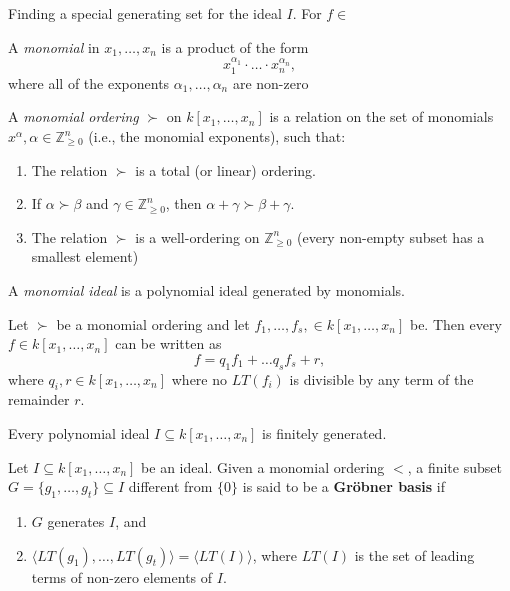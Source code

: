 \documentclass[../main.tex]{subfiles}
\begin{document}
    Finding a special generating set for the ideal $I$. For $f\in $

    \begin{definition}
        A \emph{monomial} in $x_1,\dots,x_n$ is a product of the form
        $$x_1^{\alpha_1}\cdot\dots\cdot x_n^{\alpha_n},$$
        where all of the exponents $\alpha_1,\dots,\alpha_n$ are non-zero
    \end{definition}

    \begin{definition}
        A \emph{monomial ordering} $\succ$ on $k[x_1,\dots,x_n]$ is a relation on the set of monomials $x^\alpha, \alpha\in\mathbb{Z}^n_{\geq 0}$ (i.e., the monomial exponents), such that:
        \begin{enumerate}
            \item The relation $\succ$ is a total (or linear) ordering.
            \item If $\alpha \succ \beta$ and $\gamma\in \mathbb{Z}^n_{\geq0}$, then $\alpha+\gamma\succ\beta+\gamma$.
            \item The relation $\succ$ is a well-ordering on $\mathbb{Z}^n_{\geq0}$ (every non-empty subset has a smallest element)
        \end{enumerate}
    \end{definition}

    \begin{definition}
        A \emph{monomial ideal} is a polynomial ideal generated by monomials.
    \end{definition}

    \begin{theorem}
        Let $\succ$ be a monomial ordering and let $f_1,\dots,f_s,\in k[x_1,\dots,x_n]$ be. Then every $f\in k[x_1,\dots,x_n]$ can be written as 
        $$f=q_1f_1+\dots q_sf_s+r,$$
        where $q_i,r\in k[x_1,\dots,x_n]$ where no $LT(f_i)$ is divisible by any term of the remainder $r$. 


    \end{theorem}

    \begin{theorem}
        Every polynomial ideal $I\subseteq k[x_1,\dots,x_n]$ is finitely generated.
    \end{theorem}

    \begin{definition}
        Let $I\subseteq k[x_1,\dots,x_n]$ be an ideal. Given a monomial ordering $<$, a finite subset $G=\{g_1,\dots, g_t\}\subseteq I$ different from $\{0\}$ is said to be a \textbf{Gr\"obner basis} if
        \begin{enumerate}
            \item $G$ generates $I$, and
            \item $\langle LT(g_1),\dots,LT(g_t)\rangle=\langle LT(I)\rangle$, where $LT(I)$ is the set of leading terms of non-zero elements of $I$.
        \end{enumerate}
    \end{definition}



    \begin{theorem}
        
    \end{theorem}
\end{document}
